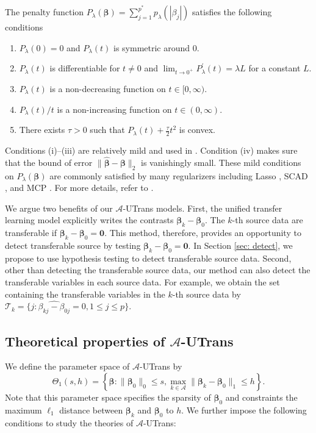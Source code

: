 \documentclass[twoside,12pt]{article}
\newcommand{\mb}[1]{\boldsymbol{\mathbf{#1}}}
\newcommand{\wh}[1]{\widehat{#1}}
\begin{document}
	The penalty function $P_{\lambda}(\mb\beta)=\sum_{j=1}^{p^*} p_{\lambda}\left(\left|\beta_{j}\right|\right)$ satisfies the following conditions
	
	\begin{enumerate}[label=(\roman*)]
		\item $P_{\lambda}(0)=0$ and $P_{\lambda}(t)$ is symmetric around 0.
		\item $P_{\lambda}(t)$ is differentiable for $t \neq 0$ and $\lim _{t \rightarrow 0^{+}} P_{\lambda}^{\prime}(t)=\lambda L$ for a constant $L$.
		\item $P_{\lambda}(t)$ is a non-decreasing function on $t \in[0, \infty)$.
		\item $P_{\lambda}(t) / t$ is a non-increasing function on $t \in(0, \infty)$.
		\item There exists $\tau>0$ such that $P_{\lambda}(t)+\frac{\tau}{2} t^{2}$ is convex.
	\end{enumerate}
	
	Conditions (i)--(iii) are relatively mild and used in \cite{zhang2012general}.
	Condition (iv) makes sure that the bound of error $\|\hat{\mb\beta}-\mb\beta\|_2$ is vanishingly small.
	These mild conditions on $P_{\lambda}(\mb\beta)$ are commonly satisfied by many regularizers including Lasso \citep{tibshirani1996regression}, SCAD \citep{FanLi}, and MCP \citep{zhang2010nearly}.
	For more details, refer to \cite{Loh2015}.
	
	We argue two benefits of our $\mathcal A$-UTrans models.
First, the unified transfer learning model explicitly writes the contrasts $\mb\beta_k-\mb\beta_0$.
The $k$-th source data are transferable if $\mb\beta_k-\mb\beta_0=\mb 0$.
This method, therefore, provides an opportunity to detect transferable source by testing $\mb\beta_k-\mb\beta_0=\mb 0$.
In Section \ref{sec: detect}, we propose to use hypothesis testing to detect transferable source data.
Second, other than detecting the transferable source data, our method can also detect the transferable variables in each source data.
For example, we obtain the set containing the transferable variables in the $k$-th source data by $\mathcal T_k=\{j: \wh{\beta_{kj}-\beta_{0j}}=0, 1\leq j\leq p\}$.


	
\subsection{Theoretical properties of $\mathcal A$-UTrans}
	We define the parameter space of $\mathcal A$-UTrans by 
	\begin{equation*}
	\Theta_1(s,h)=\left\{\mb\beta: \|\mb\beta_0\|_0\leq s, \max_{k\in\mathcal A} \|\mb\beta_k-\mb\beta_0\|_1\leq h\right\}.
	\end{equation*}
    Note that this parameter space specifies the sparsity of $\mb\beta_0$ and constraints the maximum $\ell_1$ distance between $\mb\beta_k$ and $\mb\beta_0$ to $h$.
	We further impose the following conditions to study the theories of $\mathcal A$-UTrans:
	
\end{document}
